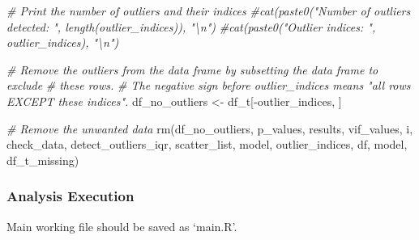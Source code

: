 \documentclass[
  11pt,
]{article}
\newenvironment{Shaded}{}{}
\newcommand{\CommentTok}[1]{\textcolor[rgb]{0.38,0.63,0.69}{\textit{#1}}}
\newcommand{\FunctionTok}[1]{\textcolor[rgb]{0.02,0.16,0.49}{#1}}
\newcommand{\NormalTok}[1]{#1}
\newcommand{\OtherTok}[1]{\textcolor[rgb]{0.00,0.44,0.13}{#1}}
\newcommand{\SpecialCharTok}[1]{\textcolor[rgb]{0.25,0.44,0.63}{#1}}
\begin{document}
\begin{Shaded}
\begin{Highlighting}[]
\CommentTok{\# Print the number of outliers and their indices}
\CommentTok{\#cat(paste0("Number of outliers detected: ", length(outlier\_indices)), "\textbackslash{}n")}
\CommentTok{\#cat(paste0("Outlier indices: ", outlier\_indices), "\textbackslash{}n")}

\CommentTok{\# Remove the outliers from the data frame by subsetting the data frame to exclude }
\CommentTok{\#   these rows.}
\CommentTok{\# The negative sign before outlier\_indices means "all rows EXCEPT these indices".}
\NormalTok{df\_no\_outliers }\OtherTok{\textless{}{-}}\NormalTok{ df\_t[}\SpecialCharTok{{-}}\NormalTok{outlier\_indices, ]}

\CommentTok{\# Remove the unwanted data}
\FunctionTok{rm}\NormalTok{(df\_no\_outliers, p\_values, results, vif\_values, i, check\_data, }
\NormalTok{   detect\_outliers\_iqr, scatter\_list, model, outlier\_indices, }
\NormalTok{   df, model, df\_t\_missing)}
\end{Highlighting}
\end{Shaded}

\subsubsection{Analysis Execution}

Main working file should be saved as `main.R'.
\end{document}
